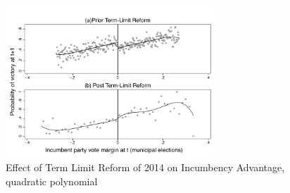 \documentclass{beamer}
\begin{document}
\begin{frame}[label=rdd_figure, noframenumbering]

\begin{figure}[H]
\centering
\caption{Effect of Term Limit Reform of 2014 on Incumbency Advantage, quadratic polynomial}
  \label{fig:incumbency_advantage} 

 \includegraphics[width=0.7\textwidth]{Figures_pres/RDD_incumbency_pol2.pdf}
     \captionsetup{justification=centering}  
        
\end{figure}  
\hyperlink{mechanism_identification}{}  

	
\end{frame}
\end{document}
